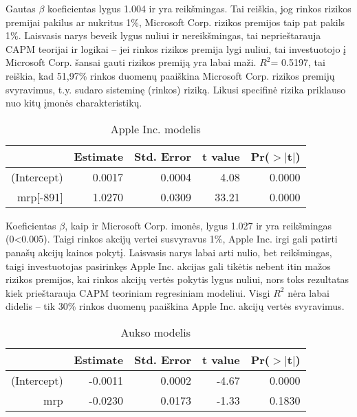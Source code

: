 \documentclass[12pt, a14paper, lithuanian]{article}
\begin{document}
Gautas $\beta$ koeficientas lygus 1.004 ir yra reikšmingas. Tai reiškia, jog rinkos rizikos premijai pakilus ar nukritus 1\%, Microsoft Corp. rizikos premijos taip pat pakils 1\%. Laisvasis narys beveik lygus nuliui ir nereikšmingas,
tai neprieštarauja CAPM teorijai ir logikai -- jei rinkos rizikos premija lygi nuliui, tai investuotojo į Microsoft Corp. šansai gauti rizikos premiją yra labai maži.
$R^2$= 0.5197, tai reiškia, kad 51,97\% rinkos duomenų paaiškina Microsoft Corp. rizikos premijų svyravimus, t.y. sudaro sisteminę (rinkos) riziką. Likusi specifinė rizika priklauso nuo kitų įmonės charakteristikų.

\begin{table}[ht]
\begin{center}
\begin{tabular}{rrrrr}
  \hline
 & Estimate & Std. Error & t value & Pr($>$$|$t$|$) \\ 
  \hline
(Intercept) & 0.0017 & 0.0004 & 4.08 & 0.0000 \\ 
  mrp[-891] & 1.0270 & 0.0309 & 33.21 & 0.0000 \\ 
   \hline
\end{tabular}
\end{center}
\caption{Apple Inc. modelis}
\end{table}

Koeficientas $\beta$, kaip ir Microsoft Corp. imonės, lygus 1.027 ir yra reikšmingas (0<0.005). Taigi rinkos akcijų vertei susvyravus 1\%, Apple
Inc. irgi gali patirti panašų akcijų kainos pokytį. Laisvasis narys labai arti nulio, bet reikšmingas,
taigi investuotojas pasirinkęs Apple Inc. akcijas gali tikėtis nebent itin mažos rizikos premijos, kai rinkos akcijų vertės
pokytis lygus nuliui, nors toks rezultatas kiek prieštarauja CAPM teoriniam regresiniam modeliui.
Visgi  $R^2$ nėra labai didelis -- tik 30\% rinkos duomenų paaiškina Apple Inc. akcijų vertės svyravimus.

\begin{table}[ht]
\begin{center}
\begin{tabular}{rrrrr}
  \hline
 & Estimate & Std. Error & t value & Pr($>$$|$t$|$) \\ 
  \hline
(Intercept) & -0.0011 & 0.0002 & -4.67 & 0.0000 \\ 
  mrp & -0.0230 & 0.0173 & -1.33 & 0.1830 \\ 
   \hline
\end{tabular}
\end{center}
\caption{Aukso modelis}
\end{table}
\end{document}
